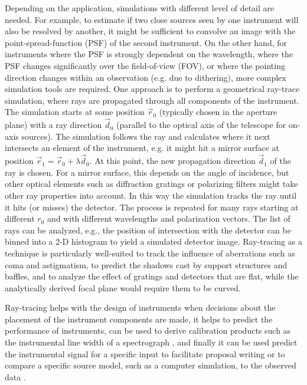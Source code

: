 \documentclass[twocolumn]{aastex61}
\begin{document}
Depending on the application, simulations with different level of detail are
needed. For example, to estimate if two close sources seen by one instrument
will also be resolved by another, it might be sufficient to convolve an image
with the point-spread-function (PSF) of the second instrument. On the other
hand, for instruments where the PSF is strongly dependent on the wavelength,
where the PSF changes significantly over the field-of-view (FOV), or where the
pointing direction changes within an observation (e.g. due to dithering), more
complex simulation tools are required. One approach is to perform a geometrical
ray-trace simulation, where rays are propagated through all components of the
instrument. The simulation starts at some position $\vec r_0$ (typically chosen
in the aperture plane) with a ray direction $\vec d_0$ (parallel to the optical
axis of the telescope for on-axis sources). The simulation follows the ray and
calculates where it next intersects an element of the instrument, e.g. it might
hit a mirror surface at position $\vec r_1 = \vec r_0 + \lambda \vec d_0$. At
this point, the new propagation direction $\vec d_1$ of the ray is chosen. For
a mirror surface, this depends on the angle of incidence, but other optical
elements such as diffraction gratings or polarizing filters might take other
ray properties into account. In this way the simulation tracks the ray until it
hits (or misses) the detector. The process is repeated for many rays starting
at different $r_0$ and with different wavelengths and polarization vectors. The list of rays can be analyzed, e.g., the position of
intersection with the detector can be binned into a 2-D histogram to yield a
simulated detector image. Ray-tracing as a technique is particularly
well-suited to track the influence of aberrations such as coma and astigmatism,
to predict the shadows cast by support structures and baffles, and to analyze
the effect of gratings and detectors that are flat, while the analytically
derived focal plane would require them to be curved.

Ray-tracing helps with the design of instruments
\citep[e.g.][]{2014SPIE.9144E..2EW} when decisions about the placement of
the instrument components are made, it helps to predict the performance of
instruments, can be used to derive calibration products such as the
instrumental line width of a spectrograph \citep{2000SPIE.4140..559F}, and
finally it can be used predict the instrumental signal for a specific input to
facilitate proposal writing or to compare a specific source model, such as a
computer simulation, to the observed data \citep[e.g.][]{2009ApJ...699.1004Z}.
\end{document}
